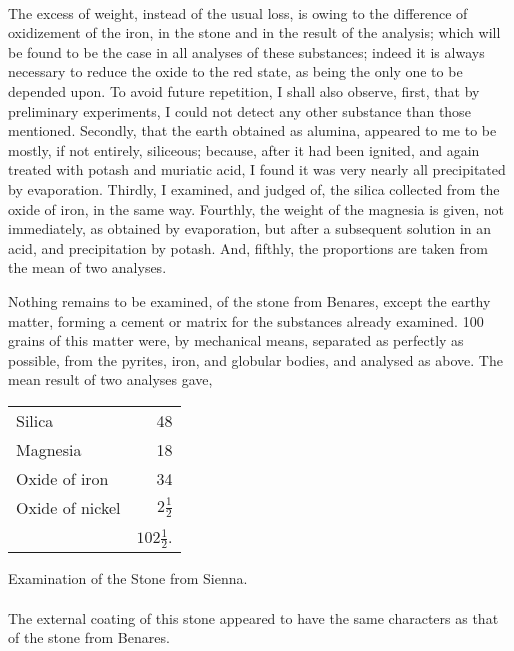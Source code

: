 \documentclass[a4paper, 12pt, oneside]{article}
\begin{document}
\paragraph{}
The excess of weight, instead of the usual loss, is owing to the difference of oxidizement of the iron, in the stone and in the result of the analysis; which will be found to be the case in all analyses of these substances; indeed it is always necessary to reduce the oxide to the red state, as being the only one to be depended upon. To avoid future repetition, I shall also observe, first, that by preliminary experiments, I could not detect any other substance than those mentioned. Secondly, that the earth obtained as alumina, appeared to me to be mostly, if not entirely, siliceous; because, after it had been ignited, and again treated with potash and muriatic acid, I found it was very nearly all precipitated by evaporation. Thirdly, I examined, and judged of, the silica collected from the oxide of iron, in the same way. Fourthly, the weight of the magnesia is given, not immediately, as obtained by evaporation, but after a subsequent solution in an acid, and precipitation by potash. And, fifthly, the proportions are taken from the mean of two analyses.

Nothing remains to be examined, of the stone from Benares, except the earthy matter, forming a cement or matrix for the substances already examined. 100 grains of this matter were, by mechanical means, separated as perfectly as possible, from the pyrites, iron, and globular bodies, and analysed as above. The mean result of two analyses gave,
\begin{table}[H]
    \centering
    \begin{tabular}{l r}
        Silica & 48 \\ 
        Magnesia & 18 \\ 
        Oxide of iron & 34 \\ 
        Oxide of nickel & $2\frac{1}{2}$   \\ \hline
        ~ & $102\frac{1}{2}$. \\
    \end{tabular}
\end{table}
\begin{center}
Examination of the Stone from Sienna.
\end{center}
\paragraph{}
The external coating of this stone appeared to have the same characters as that of the stone from Benares.
\end{document}
